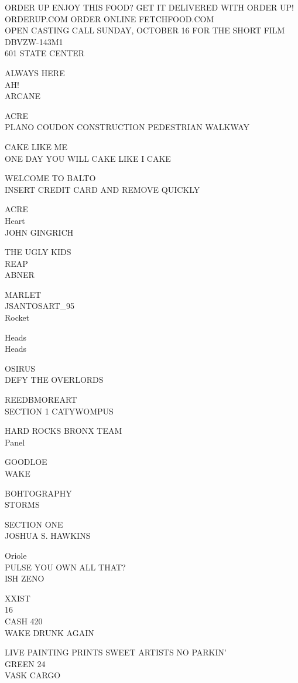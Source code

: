 \documentclass[10pt,letterpaper]{article}
\begin{document}
ORDER UP ENJOY THIS FOOD?  GET IT DELIVERED WITH ORDER UP!  ORDERUP.COM  ORDER ONLINE FETCHFOOD.COM\\
OPEN CASTING CALL SUNDAY, OCTOBER 16 FOR THE SHORT FILM\\
DBVZW{-}143M1\\
601 STATE CENTER

ALWAYS HERE\\
AH!\\
ARCANE

ACRE\\
PLANO COUDON CONSTRUCTION PEDESTRIAN WALKWAY

CAKE LIKE ME\\
ONE DAY YOU WILL CAKE LIKE I CAKE

WELCOME TO BALTO\\
INSERT CREDIT CARD AND REMOVE QUICKLY

ACRE\\
Heart\\
JOHN GINGRICH

THE UGLY KIDS\\
REAP\\
ABNER

MARLET\\
JSANTOSART\_95\\
Rocket

Heads\\
Heads

OSIRUS\\
DEFY THE OVERLORDS

REEDBMOREART\\
SECTION 1 CATYWOMPUS

HARD ROCKS BRONX TEAM\\
Panel

GOODLOE\\
WAKE

BOHTOGRAPHY\\
STORMS

SECTION ONE\\
JOSHUA S. HAWKINS

Oriole\\
PULSE YOU OWN ALL THAT?\\
ISH ZENO

XXIST\\
16\\
CASH 420\\
WAKE DRUNK AGAIN

LIVE PAINTING PRINTS SWEET ARTISTS NO PARKIN'\\
GREEN 24\\
VASK CARGO
\end{document}
